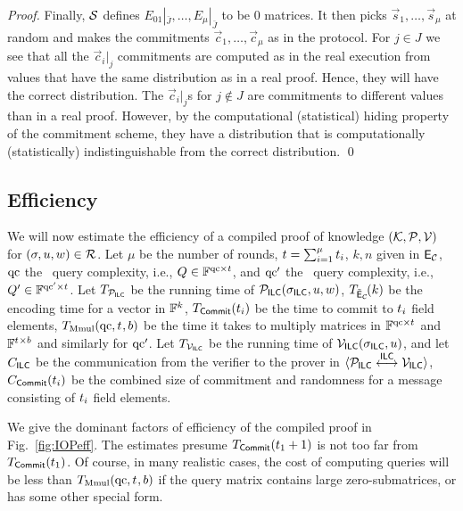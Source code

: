 \begin{proof}
Finally, $\mathcal{S}$ defines $E_{01}|_{\bar{J}},\ldots,E_{\mu}|_{\bar{J}}$ to be $0$ matrices. It then picks $\vec{s}_1,\ldots,\vec{s}_\mu$ at random and makes the commitments $\vec{c}_1,\ldots,\vec{c}_\mu$ as in the protocol. For $j\in J$ we see that all the $\vec{c}_i|_j$ commitments are computed as in the real execution from values that have the same distribution as in a real proof. Hence, they will have the correct distribution. The $\vec{c}_i|_j$s for $j\notin J$ are commitments to different values than in a real proof. However, by the computational (statistical) hiding property of the commitment scheme, they have a distribution that is computationally (statistically) indistinguishable from the correct distribution. 
\qed
\end{proof}

\subsection{Efficiency}

We will now estimate the efficiency of a compiled proof of knowledge $(\mathcal{K},\mathcal{P},\mathcal{V})$ for $(\mathsf{\sigma},u,w)\in \mathcal{R}$. Let $\mu$ be the number of rounds, $t=\sum_{i=1}^\mu t_i$, $k,n$ given in $\mathsf{E}_{\mathcal{C}}$, $\mathrm{qc}$ the \ILCopen\ query complexity, i.e., $Q \in \mathbb{F}^{\mathrm{qc}\times t}$, and $\mathrm{qc}'$ the \ILCcheck\ query complexity, i.e., $Q' \in \mathbb{F}^{\mathrm{qc}'\times t}$. Let $T_{\mathcal{P}_{\mathsf{ILC}}}$ be the running time of $\mathcal{P}_{\mathsf{ILC}}(\mathsf{\sigma}_{\mathsf{ILC}},u,w)$, $T_{\tilde{\mathsf{E}}_{\mathcal{C}}\!}(k)$ be the encoding time for a vector in $\mathbb{F}^k$, $T_{\mathsf{Commit}}(t_i)$ be the time to commit to $t_i$ field elements, $T_{\text{Mmul}}(\mathrm{qc},{t_{}},b)$ be the time it takes to multiply matrices in $\mathbb{F}^{\mathrm{qc}\times {t_{}}}$ and $\mathbb{F}^{{t_{}}\times b}$ and similarly for $\mathrm{qc}'$. Let $T_{\mathcal{V}_{\mathsf{ILC}}}$ be the running time of $\mathcal{V}_{\mathsf{ILC}}(\mathsf{\sigma}_{\mathsf{ILC}},u)$, and let $C_{\mathsf{ILC}}$ be the communication from the verifier to the prover in $\langle \mathcal{P}_{\mathsf{ILC}} \overset{\mathsf{ILC}}{\longleftrightarrow} \mathcal{V}_{\mathsf{ILC}}\rangle$, $C_{\mathsf{Commit}}(t_i)$ be the combined size of commitment and randomness for a message consisting of $t_i$ field elements.

We give the dominant factors of efficiency of the compiled proof in Fig.~\ref{fig:IOPeff}. The estimates presume $T_{\mathsf{Commit}}(t_1+1)$ is not too far from $T_{\mathsf{Commit}}(t_1)$. Of course, in many realistic cases, the cost of computing queries will be less than $T_{\text{Mmul}}(\mathrm{qc},{t_{}},b)$ if the query matrix contains large zero-submatrices, or has some other special form.

